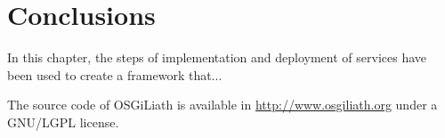 \section{Conclusions}

In this chapter, the steps of implementation and deployment of services have been used to create a framework that...

The source code of OSGiLiath is available in \url{http://www.osgiliath.org} under a GNU/LGPL license.
